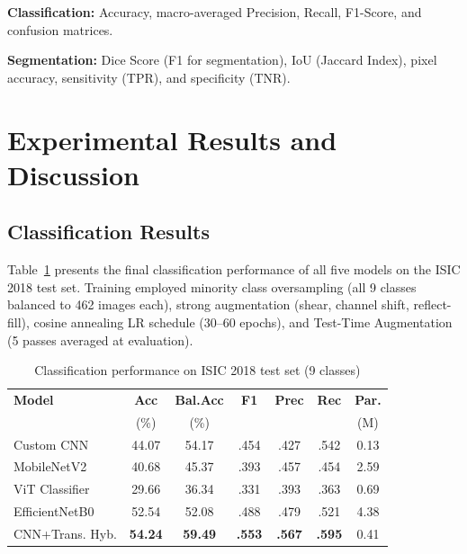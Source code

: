 \documentclass[10pt,twocolumn]{article}
\begin{document}
\textbf{Classification:} Accuracy, macro-averaged Precision, Recall, F1-Score, and confusion matrices.

\textbf{Segmentation:} Dice Score (F1 for segmentation), IoU (Jaccard Index), pixel accuracy, sensitivity (TPR), and specificity (TNR).

\section{Experimental Results and Discussion}

\subsection{Classification Results}

Table~\ref{tab:clf_results} presents the final classification performance of all five models on the ISIC 2018 test set. Training employed minority class oversampling (all 9 classes balanced to 462 images each), strong augmentation (shear, channel shift, reflect-fill), cosine annealing LR schedule (30--60 epochs), and Test-Time Augmentation (5 passes averaged at evaluation).

\begin{table}[htbp]
\centering
\caption{Classification performance on ISIC 2018 test set (9 classes)}
\label{tab:clf_results}
\scriptsize
\setlength{\tabcolsep}{3pt}
\begin{tabular}{lcccccc}
\toprule
\textbf{Model} & \textbf{Acc} & \textbf{Bal.Acc} & \textbf{F1} & \textbf{Prec} & \textbf{Rec} & \textbf{Par.} \\
                & (\%)         & (\%)             &             &               &              & (M) \\
\midrule
Custom CNN        & 44.07 & 54.17 & .454 & .427 & .542 & 0.13 \\
MobileNetV2       & 40.68 & 45.37 & .393 & .457 & .454 & 2.59 \\
ViT Classifier    & 29.66 & 36.34 & .331 & .393 & .363 & 0.69 \\
EfficientNetB0    & 52.54 & 52.08 & .488 & .479 & .521 & 4.38 \\
CNN+Trans. Hyb.   & \textbf{54.24} & \textbf{59.49} & \textbf{.553} & \textbf{.567} & \textbf{.595} & 0.41 \\
\bottomrule
\end{tabular}
\end{table}
\end{document}
